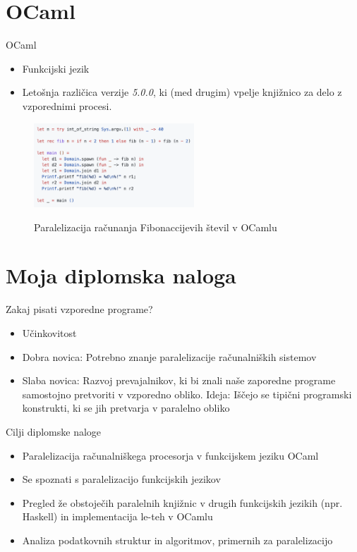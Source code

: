 \documentclass{beamer}
\begin{document}
\section{OCaml}

\begin{frame}{OCaml}
    \begin{itemize}
        \item Funkcijski jezik
        \item Leto\v snja razli\v cica verzije \textit{5.0.0}, ki (med drugim) vpelje knji\v znico za delo z vzporednimi procesi.
    \end{itemize}
    
    \begin{figure}
    \caption{Paralelizacija ra\v cunanja Fibonaccijevih \v stevil v OCamlu}
    \includegraphics[width=6cm]{slike/OCaml-primer.png}
    \label{fig:OCaml-fibonacci}
    \end{figure}

\end{frame}


\section{Moja diplomska naloga}

\begin{frame}{Zakaj pisati vzporedne programe?}
    \begin{itemize}
        \item U\v cinkovitost
        \item Dobra novica: Potrebno znanje paralelizacije ra\v cunalni\v skih sistemov
        \item Slaba novica: Razvoj prevajalnikov, ki bi znali na\v se zaporedne programe samostojno pretvoriti v vzporedno obliko. Ideja: I\v s\v cejo se tipi\v cni programski konstrukti, ki se jih pretvarja v paralelno obliko
    \end{itemize}
\end{frame}

\begin{frame}{Cilji diplomske naloge}
    \begin{itemize}
        \item Paralelizacija ra\v cunalni\v skega procesorja v funkcijskem jeziku OCaml
        \item Se spoznati s paralelizacijo funkcijskih jezikov
        \item Pregled \v ze obstoje\v cih paralelnih knji\v znic v drugih funkcijskih jezikih (npr. Haskell) in implementacija le-teh v OCamlu
        \item Analiza podatkovnih struktur in algoritmov, primernih za paralelizacijo
    \end{itemize}
    
\end{frame}
\end{document}
